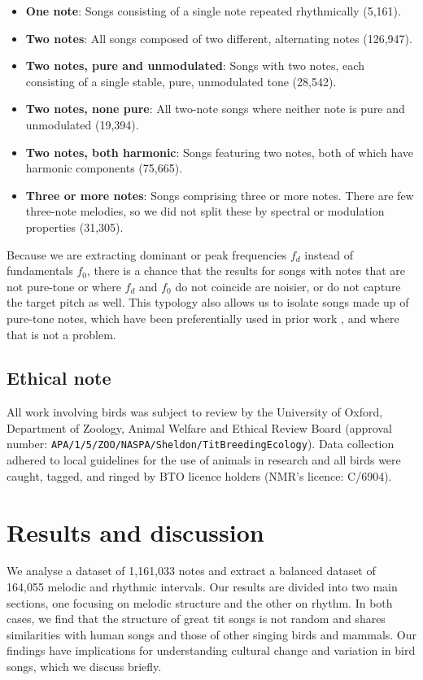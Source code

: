 \begin{itemize}
    \item \textbf{One note}: Songs consisting of a single note repeated rhythmically (5,161).
    \item \textbf{Two notes}: All songs composed of two different, alternating notes (126,947).
    \item \textbf{Two notes, pure and unmodulated}: Songs with two notes, each consisting of a single stable, pure, unmodulated tone (28,542).
    \item \textbf{Two notes, none pure}: All two-note songs where neither note is pure and unmodulated (19,394).
    \item \textbf{Two notes, both harmonic}: Songs featuring two notes, both of which have harmonic components (75,665).
    \item \textbf{Three or more notes}: Songs comprising three or more notes. There are few three-note melodies, so we did not split these by spectral or modulation properties (31,305).
\end{itemize}

\noindent Because we are extracting dominant or peak frequencies $f_d$ instead of fundamentals $f_0$, there is a chance that the results for songs with notes that are not pure-tone or where $f_d$ and $f_0$ do not coincide are noisier, or do not capture the target pitch as well. This typology also allows us to isolate songs made up of pure-tone notes, which have been preferentially used in prior work \autocite{dobson1977, tierney2011a, doolittle2012, doolittle2014}, and where that is not a problem.

\subsection{Ethical note}
All work involving birds was subject to review by the University of Oxford, Department of Zoology, Animal Welfare and Ethical Review Board (approval number: \nolinkurl{APA/1/5/ZOO/NASPA/Sheldon/TitBreedingEcology}). Data collection adhered to local guidelines for the use of animals in research and all birds were caught, tagged, and ringed by BTO licence holders (NMR's licence: C/6904).

\section{Results and discussion}

We analyse a dataset of 1,161,033 notes and extract a balanced dataset of 164,055 melodic and rhythmic intervals. Our results are divided into two main sections, one focusing on melodic structure and the other on rhythm. In both cases, we find that the structure of great tit songs is not random and shares similarities with human songs and those of other singing birds and mammals. Our findings have implications for understanding cultural change and variation in bird songs, which we discuss briefly.

